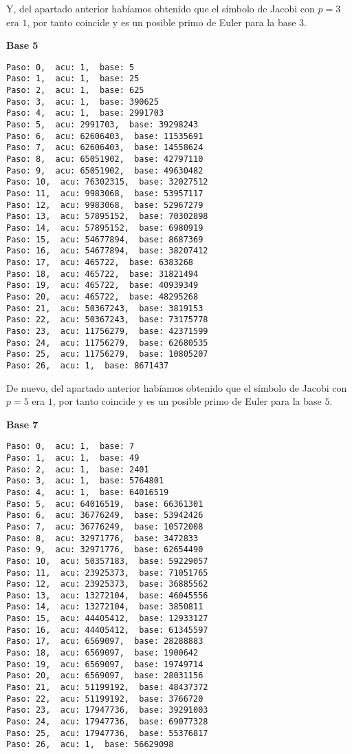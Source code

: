 \documentclass[a4paper]{article}
\begin{document}
Y, del apartado anterior habíamos obtenido que el símbolo de Jacobi con $p=3$ era $1$, por tanto coincide y es un posible primo de Euler para la base $3$.

\textbf{Base 5}
\begin{verbatim}
Paso: 0,  acu: 1,  base: 5  
Paso: 1,  acu: 1,  base: 25  
Paso: 2,  acu: 1,  base: 625  
Paso: 3,  acu: 1,  base: 390625  
Paso: 4,  acu: 1,  base: 2991703  
Paso: 5,  acu: 2991703,  base: 39298243  
Paso: 6,  acu: 62606403,  base: 11535691  
Paso: 7,  acu: 62606403,  base: 14558624  
Paso: 8,  acu: 65051902,  base: 42797110  
Paso: 9,  acu: 65051902,  base: 49630482  
Paso: 10,  acu: 76302315,  base: 32027512  
Paso: 11,  acu: 9983068,  base: 53957117  
Paso: 12,  acu: 9983068,  base: 52967279  
Paso: 13,  acu: 57895152,  base: 70302898  
Paso: 14,  acu: 57895152,  base: 6980919  
Paso: 15,  acu: 54677894,  base: 8687369  
Paso: 16,  acu: 54677894,  base: 38207412  
Paso: 17,  acu: 465722,  base: 6383268  
Paso: 18,  acu: 465722,  base: 31821494  
Paso: 19,  acu: 465722,  base: 40939349  
Paso: 20,  acu: 465722,  base: 48295268  
Paso: 21,  acu: 50367243,  base: 3819153  
Paso: 22,  acu: 50367243,  base: 73175778  
Paso: 23,  acu: 11756279,  base: 42371599  
Paso: 24,  acu: 11756279,  base: 62680535  
Paso: 25,  acu: 11756279,  base: 10805207  
Paso: 26,  acu: 1,  base: 8671437  
\end{verbatim}

De nuevo, del apartado anterior habíamos obtenido que el símbolo de Jacobi con $p=5$ era $1$, por tanto coincide y es un posible primo de Euler para la base $5$.

\textbf{Base 7}
\begin{verbatim}
Paso: 0,  acu: 1,  base: 7  
Paso: 1,  acu: 1,  base: 49  
Paso: 2,  acu: 1,  base: 2401  
Paso: 3,  acu: 1,  base: 5764801  
Paso: 4,  acu: 1,  base: 64016519  
Paso: 5,  acu: 64016519,  base: 66361301  
Paso: 6,  acu: 36776249,  base: 53942426  
Paso: 7,  acu: 36776249,  base: 10572008  
Paso: 8,  acu: 32971776,  base: 3472833  
Paso: 9,  acu: 32971776,  base: 62654490  
Paso: 10,  acu: 50357183,  base: 59229057  
Paso: 11,  acu: 23925373,  base: 71051765  
Paso: 12,  acu: 23925373,  base: 36885562  
Paso: 13,  acu: 13272104,  base: 46045556  
Paso: 14,  acu: 13272104,  base: 3850811  
Paso: 15,  acu: 44405412,  base: 12933127  
Paso: 16,  acu: 44405412,  base: 61345597  
Paso: 17,  acu: 6569097,  base: 28288883  
Paso: 18,  acu: 6569097,  base: 1900642  
Paso: 19,  acu: 6569097,  base: 19749714  
Paso: 20,  acu: 6569097,  base: 28031156  
Paso: 21,  acu: 51199192,  base: 48437372  
Paso: 22,  acu: 51199192,  base: 3766720  
Paso: 23,  acu: 17947736,  base: 39291003  
Paso: 24,  acu: 17947736,  base: 69077328  
Paso: 25,  acu: 17947736,  base: 55376817  
Paso: 26,  acu: 1,  base: 56629098  
\end{verbatim}
\end{document}
